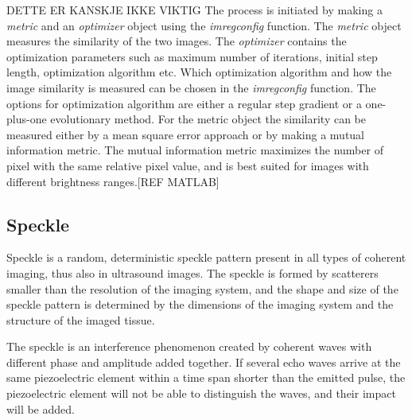 DETTE ER KANSKJE IKKE VIKTIG
The process is initiated by making a \textit{metric} and an \textit{optimizer} object using the \textit{imregconfig} function. The \textit{metric} object measures the similarity of the two images. The \textit{optimizer} contains the optimization parameters such as maximum number of iterations, initial step length, optimization algorithm etc. Which optimization algorithm and how the image similarity is measured can be chosen in the \textit{imregconfig} function. The options for optimization algorithm are either a regular step gradient or a one-plus-one evolutionary method. For the metric object the similarity can be measured either by a mean square error approach or by making a mutual information metric. The mutual information metric maximizes the number of pixel with the same relative pixel value, and is best suited for images with different brightness ranges.[REF MATLAB]

\subsection{Speckle}
Speckle is a random, deterministic speckle pattern present in all types of coherent imaging, thus also in ultrasound images. The speckle is formed by scatterers smaller than the resolution of the imaging system, and the shape and size of the speckle pattern is determined by the dimensions of the imaging system and the structure of the imaged tissue.

The speckle is an interference phenomenon created by coherent waves with different phase and amplitude added together. If several echo waves arrive at the same piezoelectric element within a time span shorter than the emitted pulse, the piezoelectric element will not be able to distinguish the waves, and their impact will be added. 










